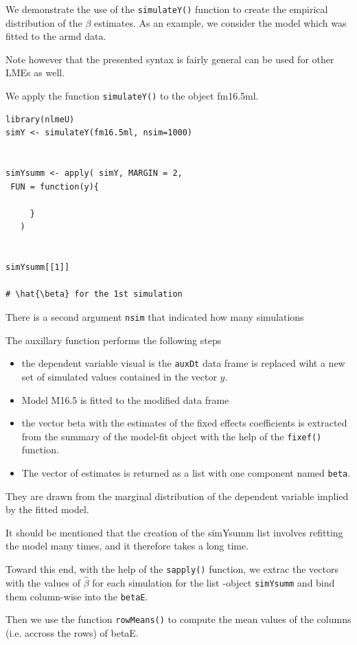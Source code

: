 \documentclass[a4paper,12pt]{article}
\begin{document}
We demonstrate the use of the \texttt{simulateY()} function to create the empirical distribution of the \textbf{$\beta$} estimates.
As an example, we consider the model which was fitted to the armd data.

Note however that the presented syntax is fairly general can be used for other LMEs as well.

We apply the function \texttt{simulateY()} to the object fm16.5ml.



\begin{framed}
\begin{verbatim}
library(nlmeU)
simY <- simulateY(fm16.5ml, nsim=1000)


simYsumm <- apply( simY, MARGIN = 2, 
 FUN = function(y){

     }
   )


simYsumm[[1]]

# \hat{\beta} for the 1st simulation
\end{verbatim}
\end{framed}

There is a second argument \texttt{nsim} that indicated how many simulations 

The auxillary function performs the following steps

\begin{itemize}
\item the dependent variable visual is the \texttt{auxDt} data frame is replaced wiht a new set of simulated values contained in the vector $y$.
\item Model M16.5 is fitted to the modified data frame
\item the vector beta with the estimates of the fixed effects coefficients is extracted from the summary of the model-fit object with the help of the \texttt{fixef()} function.
\item The vector of estimates is returned as a list with one component named \texttt{beta}.
\end{itemize}

They are drawn from the marginal distribution of the dependent variable implied by the fitted model.



It should be mentioned that the creation of the simYsumm list involves refitting the model many times, and it therefore takes a long time.

Toward this end, with the help of the \texttt{sapply()} function, we extrac the vectors with the values of $\hat{\beta}$ for each simulation for the list
-object \texttt{simYsumm} and bind them column-wise into the \texttt{betaE}.

Then we use the function \texttt{rowMeans()} to compute the mean values of the columns (i.e. accross the rows) of betaE.



\end{document}

